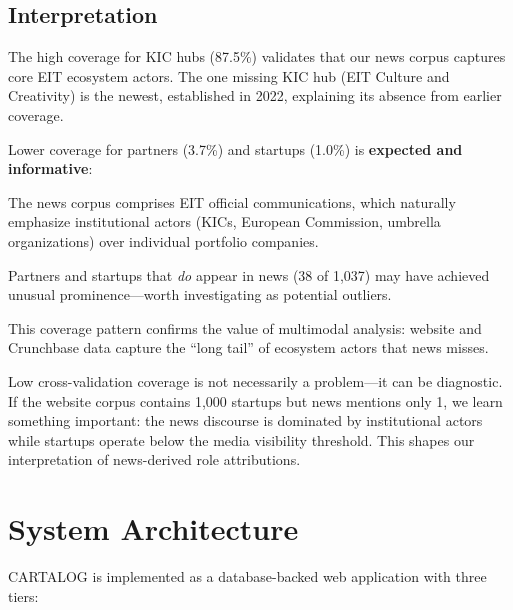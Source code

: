 \documentclass[../main.tex]{subfiles}
\begin{document}
\subsection{Interpretation}

The high coverage for KIC hubs (87.5\%) validates that our news corpus captures core EIT ecosystem actors. The one missing KIC hub (EIT Culture and Creativity) is the newest, established in 2022, explaining its absence from earlier coverage.

Lower coverage for partners (3.7\%) and startups (1.0\%) is \textbf{expected and informative}:

\begin{description}[leftmargin=0.5cm, itemsep=0.3em]
\item[News source composition] The news corpus comprises EIT official communications, which naturally emphasize institutional actors (KICs, European Commission, umbrella organizations) over individual portfolio companies.

\item[Legitimacy signal] Partners and startups that \emph{do} appear in news (38 of 1,037) may have achieved unusual prominence---worth investigating as potential outliers.

\item[Corpus complementarity] This coverage pattern confirms the value of multimodal analysis: website and Crunchbase data capture the ``long tail'' of ecosystem actors that news misses.
\end{description}

\begin{criticalbox}
Low cross-validation coverage is not necessarily a problem---it can be diagnostic. If the website corpus contains 1,000 startups but news mentions only 1, we learn something important: the news discourse is dominated by institutional actors while startups operate below the media visibility threshold. This shapes our interpretation of news-derived role attributions.
\end{criticalbox}


\section{System Architecture}

\textsc{CARTALOG} is implemented as a database-backed web application with three tiers:
\end{document}

